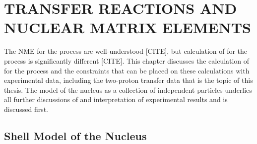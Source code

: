 %
%
%
%
%
%
%
%

%
%

\chapter{TRANSFER REACTIONS AND NUCLEAR MATRIX ELEMENTS}
\label{chap:nucl}

The NME for the \tvbb process are well-understood [CITE], but calculation of \NME for the \zvbb process is significantly different [CITE].  This chapter discusses the calculation of \NME for the \zvbb process and the constraints that can be placed on these calculations with experimental data, including the two-proton transfer data that is the topic of this thesis.  The model of the nucleus as a collection of independent particles underlies all further discussions of \NME and interpretation of experimental results and is discussed first.    

\section{Shell Model of the Nucleus}

